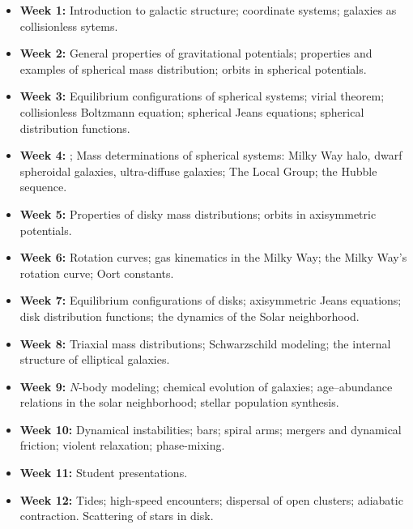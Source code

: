 \documentclass{article}
\begin{document}
\begin{itemize}

  \item {\bf Week 1:} Introduction to galactic structure; coordinate
    systems; galaxies as collisionless sytems.

  \item {\bf Week 2:} General properties of gravitational potentials;
    properties and examples of spherical mass distribution; orbits in
    spherical potentials.

  \item {\bf Week 3:} Equilibrium configurations of spherical systems;
    virial theorem; collisionless Boltzmann equation; spherical Jeans
    equations; spherical distribution functions.

  \item {\bf Week 4:} ; Mass determinations of spherical systems:
    Milky Way halo, dwarf spheroidal galaxies, ultra-diffuse galaxies;
    The Local Group; the Hubble sequence.

  \item {\bf Week 5:} Properties of disky mass distributions; orbits
    in axisymmetric potentials.

  \item {\bf Week 6:} Rotation curves; gas kinematics in the Milky
    Way; the Milky Way's rotation curve; Oort constants.

  \item {\bf Week 7:} Equilibrium configurations of disks;
    axisymmetric Jeans equations; disk distribution functions; the
    dynamics of the Solar neighborhood.

  \item {\bf Week 8:} Triaxial mass distributions; Schwarzschild
    modeling; the internal structure of elliptical galaxies.

  \item {\bf Week 9:} $N$-body modeling; chemical evolution of
    galaxies; age--abundance relations in the solar neighborhood;
    stellar population synthesis.

  \item {\bf Week 10:} Dynamical instabilities; bars; spiral arms;
    mergers and dynamical friction; violent relaxation; phase-mixing.

  \item {\bf Week 11:} Student presentations.

  \item {\bf Week 12:} Tides; high-speed encounters; dispersal of open
    clusters; adiabatic contraction. Scattering of stars in disk.

\end{itemize}
\end{document}
